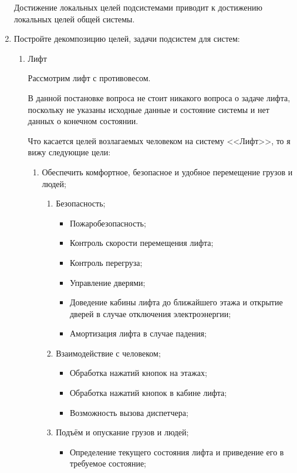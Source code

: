 \documentclass[10pt]{article}
\begin{document}
\begin{enumerate}
  Достижение локальных целей подсистемами приводит к достижению локальных целей общей системы.

\item{Постройте декомпозицию целей, задачи подсистем для систем:}

  \begin{enumerate}
  \item{Лифт}
    
    Рассмотрим лифт с противовесом.
    
    В данной постановке вопроса не стоит никакого вопроса о задаче лифта, поскольку не указаны исходные данные и состояние системы и нет данных о конечном состоянии.

    Что касается целей возлагаемых человеком на систему <<Лифт>>, то я вижу следующие цели:

    \begin{enumerate}
    \item{Обеспечить комфортное, безопасное и удобное перемещение грузов и людей;}
      \begin{enumerate}
      \item{Безопасность;}
        \begin{itemize}
        \item{Пожаробезопасность;}
        \item{Контроль скорости перемещения лифта;}
        \item{Контроль перегруза;}
        \item{Управление дверями;}
        \item{Доведение кабины лифта до ближайшего этажа и открытие дверей в случае отключения электроэнергии;}
        \item{Амортизация лифта в случае падения;}
        \end{itemize}
      \item{Взаимодействие с человеком;}
        \begin{itemize}
        \item{Обработка нажатий кнопок на этажах;}
        \item{Обработка нажатий кнопок в кабине лифта;}
        \item{Возможность вызова диспетчера;}
        \end{itemize}
      \item{Подъём и опускание грузов и людей;}
        \begin{itemize}
        \item{Определение текущего состояния лифта и приведение его в требуемое состояние;}
        \end{itemize}
      \end{enumerate}
    \end{enumerate}


\end{enumerate}
\end{enumerate}
\end{document}
